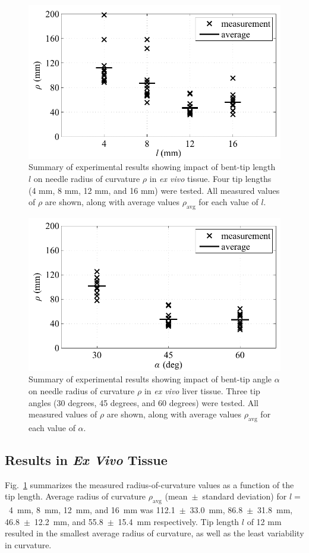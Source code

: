 \begin{figure}[!t]
\centering
\includegraphics[width=0.6\columnwidth]{Images/Chapter3/CurvatureVsLength/CurvatureVsLength}%
\caption[Impact of bent-tip length on needle radius of curvature]{Summary of experimental results showing impact of bent-tip length $l$ on needle radius of curvature $\rho$ in \textit{ex vivo} tissue. Four tip lengths (4 mm, 8 mm, 12 mm, and 16 mm) were tested. All measured values of $\rho$ are shown, along with average values $\rho_{\text{avg}}$ for each value of $l$.}
\label{fig:CurvatureVsLength}
\end{figure}

\begin{figure}[!t]
\centering
\includegraphics[width=0.6\columnwidth]{Images/Chapter3/CurvatureVsAngle/CurvatureVsAngle}%
\caption[Impact of bent-tip angle on needle radius of curvature]{Summary of experimental results showing impact of bent-tip angle $\alpha$ on needle radius of curvature $\rho$ in \textit{ex vivo} liver tissue. Three tip angles (30 degrees, 45 degrees, and 60 degrees) were tested. All measured values of $\rho$ are shown, along with average values $\rho_{\text{avg}}$ for each value of $\alpha$.}
\label{fig:CurvatureVsAngle}
\end{figure} 

\subsection{Results in \textit{Ex Vivo} Tissue}
Fig.~\ref{fig:CurvatureVsLength} summarizes the measured radius-of-curvature values as a function of the tip length. Average radius of curvature $\rho_{\text{avg}}$ (mean~$\pm$~standard deviation) for $l =$~4~mm, 8~mm, 12~mm, and 16~mm was 112.1~$\pm$~33.0~mm, 86.8~$\pm$~31.8~mm, 46.8~$\pm$~12.2~mm, and 55.8~$\pm$~15.4~mm respectively. Tip length $l$ of 12 mm resulted in the smallest average radius of curvature, as well as the least variability in curvature. 

